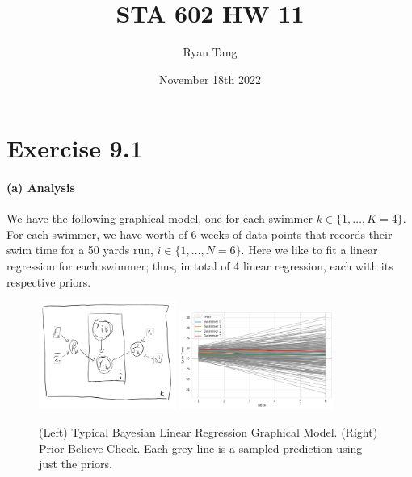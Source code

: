 \documentclass[11pt, letterpaper]{article}
\author{Ryan Tang}
\title{STA 602 HW 11}
\date{November 18th 2022}
\begin{document}
\maketitle

\section{Exercise 9.1}
\paragraph{(a) Analysis}
We have the following graphical model, one for each swimmer $k \in \{1, \dots, K=4\}$. For each swimmer, we have worth of 6 weeks of data points that records their swim time for a 50 yards run, $i \in \{1, \dots, N=6\}$. Here we like to fit a linear regression for each swimmer; thus, in total of 4 linear regression, each with its respective priors.
\begin{figure}[!h]
  \centering
  \includegraphics[width=0.4\textwidth]{1.2.graph.png}
  \includegraphics[width=0.45\textwidth]{1.1.png}
  \caption{(Left) Typical Bayesian Linear Regression Graphical Model. (Right) Prior Believe Check. Each grey line is a sampled prediction using just the priors.}
\end{figure}
\end{document}
